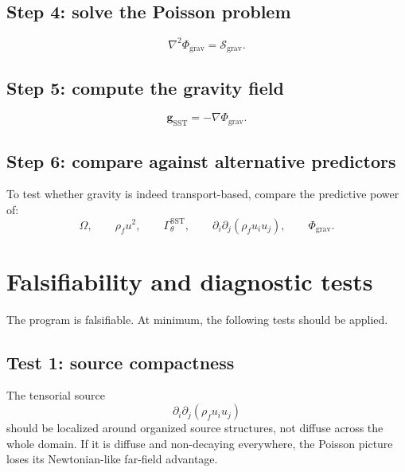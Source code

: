 \documentclass[11pt]{article}
\newcommand{\rhoF}{\rho_{\!f}}
\newcommand{\SST}{\mathrm{SST}}
\newcommand{\grav}{\mathrm{grav}}
\begin{document}
        \subsection*{Step 4: solve the Poisson problem}
            \begin{equation}
                \nabla^2 \Phi_{\grav} = \mathcal{S}_{\grav}.
                \label{eq:workflow-poisson}
            \end{equation}
        
        \subsection*{Step 5: compute the gravity field}
            \begin{equation}
                \mathbf{g}_{\SST} = -\nabla\Phi_{\grav}.
                \label{eq:workflow-g}
            \end{equation}
        
        \subsection*{Step 6: compare against alternative predictors}
            To test whether gravity is indeed transport-based, compare the predictive power of:
            \begin{equation}
                \Omega,
                \qquad
                \rhoF u^2,
                \qquad
                \Gamma_\theta^{\SST},
                \qquad
                \partial_i\partial_j(\rhoF u_i u_j),
                \qquad
                \Phi_{\grav}.
                \label{eq:workflow-comparison}
            \end{equation}
        
        \section{Falsifiability and diagnostic tests}
        
        The program is falsifiable. At minimum, the following tests should be applied.
        
        \subsection{Test 1: source compactness}
            The tensorial source
            \[
                \partial_i\partial_j(\rhoF u_i u_j)
            \]
            should be localized around organized source structures, not diffuse across the whole domain. If it is diffuse and non-decaying everywhere, the Poisson picture loses its Newtonian-like far-field advantage.
        
\end{document}
